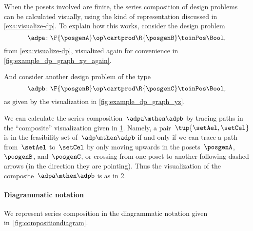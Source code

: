 When the posets involved are finite, the series composition of design problems can be calculated visually, using the kind of representation discussed in \cref{exa:visualize-dp}. To explain how this works, consider the design problem
\begin{equation*}
    \adpa \colon \F{\posgenA} \op \cartprod  \R{\posgenB} \toinPos \Bool,
\end{equation*}
from \cref{exa:visualize-dp}, visualized again for convenience in \cref{fig:example_dp_graph_xy_again}.
\begin{marginfigure}
    \centering
    \caption{ }
    \label{fig:example_dp_graph_xy_again}
\end{marginfigure}
And consider another design problem of the type
\begin{equation*}
    \adpb \colon \F{\posgenB} \op \cartprod  \R{\posgenC} \toinPos \Bool,
\end{equation*}
as given by the visualization in \cref{fig:example_dp_graph_yz}.
\begin{marginfigure}
    \centering
    \caption{ }
    \label{fig:example_dp_graph_yz}
\end{marginfigure}
We can calculate the series composition~$\adpa \mthen \adpb$ by tracing paths in the ``composite'' visualization given in \cref{fig:example_dp_graph_xyz}.
Namely, a pair~$\tup{\setAel, \setCel}$ is in the feasibility set of~$\adp \mthen \adpb$ if and only if we can trace a path from~$\setAel$ to~$\setCel$ by only moving upwards in the posets~$\posgenA$,~$\posgenB$, and~$\posgenC$, or crossing from one poset to another following dashed arrows (in the direction they are pointing).
Thus the visualization of the composite~$\adpa \mthen \adpb$ is as in \cref{fig:example_dp_graph_xz}.
\begin{figure}[h!]
    \centering
    \caption{}
    \label{fig:example_dp_graph_xyz}
\end{figure}
\begin{figure}[h!]
    \centering
    \caption{}
    \label{fig:example_dp_graph_xz}
\end{figure}



\paragraph{Diagrammatic notation}
We represent series composition in the diagrammatic notation given in~\cref{fig:compositiondiagram}.

